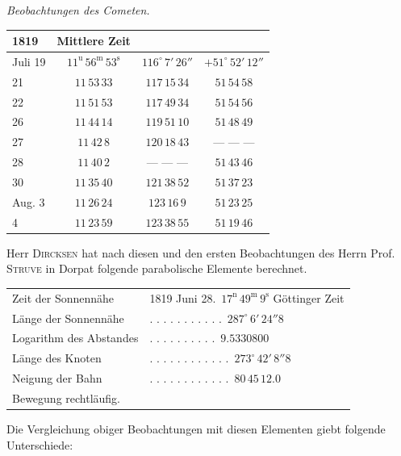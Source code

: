 \begin{center}
\emph{Beobachtungen des Cometen.}
\end{center}

\begin{center}
\begin{tabular}{l|c|c|c}
1819 & Mittlere Zeit & & \\
\hline
Juli 19 & $11^{\mathrm u}\,56^{\mathrm m}\,53^{\mathrm s}$ & $116^\circ\,7'\,26''$ & $+51^\circ\,52'\,12''$ \\
21 & $11\,53\,33$ & $117\,15\,34$ & $51\,54\,58$ \\
22 & $11\,51\,53$ & $117\,49\,34$ & $51\,54\,56$ \\
26 & $11\,44\,14$ & $119\,51\,10$ & $51\,48\,49$ \\
27 & $11\,42\,8$ & $120\,18\,43$ & --- --- --- \\
28 & $11\,40\,2$ & --- --- --- & $51\,43\,46$ \\
30 & $11\,35\,40$ & $121\,38\,52$ & $51\,37\,23$ \\
Aug. 3 & $11\,26\,24$ & $123\,16\,9$ & $51\,23\,25$ \\
4 & $11\,23\,59$ & $123\,38\,55$ & $51\,19\,46$ \\
\end{tabular}
\end{center}

\par\indent Herr \textsc{Dircksen} hat nach diesen und den ersten Beobachtungen des Herrn Prof. \textsc{Struve} in Dorpat folgende parabolische Elemente berechnet.

\begin{center}
\begin{tabular}{ll}
Zeit der Sonnennähe & 1819 Juni 28.\ $17^{\mathrm n}\,49^{\mathrm m}\,9^{\mathrm s}$ Göttinger Zeit \\
Länge der Sonnennähe & . . . . . . . . . . .\ $287^\circ\,6'\,24''8$ \\
Logarithm des Abstandes & . . . . . . . . . .\ $9.5330800$ \\
Länge des Knoten & . . . . . . . . . . . .\ $273^\circ\,42'\,8''8$ \\
Neigung der Bahn & . . . . . . . . . . . .\ $80\,45\,12.0$ \\
\multicolumn{2}{l}{Bewegung rechtläufig.}
\end{tabular}
\end{center}

\par\indent Die Vergleichung obiger Beobachtungen mit diesen Elementen giebt folgende Unterschiede:

